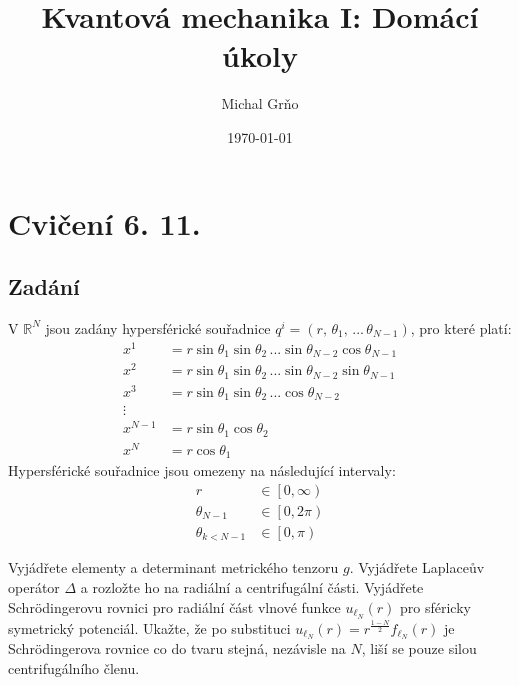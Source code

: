 \documentclass[10pt,a4paper]{article}
\begin{document}
\title{Kvantová mechanika I: Domácí úkoly}
\author{Michal Grňo}
\date{\today}

\maketitle

\section{Cvičení 6. 11.}

\subsection{Zadání}
V $\mathbb{R}^N$ jsou zadány hypersférické souřadnice $q^i = (r, \, \theta_1, \, ... \, \theta_{N-1})$, pro které platí:
\begin{align*}
    x^1 &= r \sin \theta_1 \sin \theta_2 \, ... \sin \theta_{N-2} \cos \theta_{N-1} \\
    x^2 &= r \sin \theta_1 \sin \theta_2 \, ... \sin \theta_{N-2} \sin \theta_{N-1} \\
    x^3 &= r \sin \theta_1 \sin \theta_2 \, ... \cos \theta_{N-2} \\
    \vdots \\
    x^{N-1} &= r \sin \theta_1 \cos \theta_2 \\
    x^N &= r \cos \theta_1
\end{align*}
Hypersférické souřadnice jsou omezeny na následující intervaly:
\begin{align*}
    r &\in \left[ 0, \infty \right) \\
    \theta_{N-1} &\in \left[ 0, 2\pi \right) \\
    \theta_{k<N-1} &\in \left[ 0, \pi \right)
\end{align*}

Vyjádřete elementy a determinant metrického tenzoru $g$. Vyjádřete Laplaceův operátor $\Delta$ a rozložte ho na radiální a centrifugální části. Vyjádřete Schrödingerovu rovnici pro radiální část vlnové funkce $u_{\ell_N}(r)$ pro sféricky symetrický potenciál. Ukažte, že po substituci $u_{\ell_N}(r) = r^\frac{1-N}{2} f_{\ell_N}(r)$ je Schrödingerova rovnice co do tvaru stejná, nezávisle na $N$, liší se pouze silou centrifugálního členu.
\end{document}
